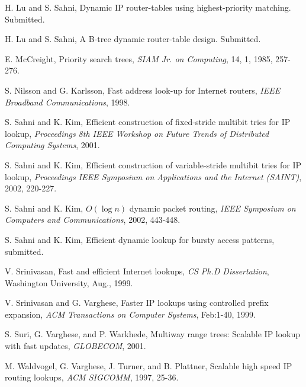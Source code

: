 \begin{thebibliography}{99}
H. Lu and S. Sahni,
Dynamic IP router-tables using highest-priority matching.
Submitted.


H. Lu and S. Sahni,
A B-tree dynamic router-table design.
Submitted.


E. McCreight,
Priority search trees,
{\em SIAM Jr. on Computing}, 14, 1, 1985, 257-276.



S. Nilsson and G. Karlsson,
Fast address look-up for Internet routers,
{\em IEEE Broadband Communications}, 1998.

S. Sahni and K. Kim,
Efficient construction of fixed-stride multibit tries for IP lookup,
{\em Proceedings 8th IEEE Workshop on Future Trends of Distributed
Computing Systems}, 2001.

S. Sahni and K. Kim,
Efficient construction of variable-stride multibit tries for IP lookup,
{\em Proceedings IEEE Symposium on Applications and the Internet (SAINT)},
2002, 220-227.

S. Sahni and K. Kim,
$O(\log n)$ dynamic packet routing,
{\em IEEE Symposium on Computers and Communications}, 2002, 443-448.

S. Sahni and K. Kim,
Efficient dynamic lookup for bursty access patterns,
submitted.

 V. Srinivasan, Fast and efficient Internet lookups, {\em CS Ph.D Dissertation}, Washington University, Aug., 1999.

 V. Srinivasan and G. Varghese, 
Faster IP lookups using controlled prefix expansion, {\em ACM Transactions
on Computer Systems}, Feb:1-40, 1999.

S. Suri, G. Varghese, and P. Warkhede,
Multiway range trees: Scalable IP lookup with fast updates,
{\em GLOBECOM}, 2001.

M. Waldvogel, G. Varghese, J. Turner, and B. Plattner,
Scalable high speed IP routing lookups,
{\em ACM SIGCOMM}, 1997, 25-36.
\end{thebibliography}

